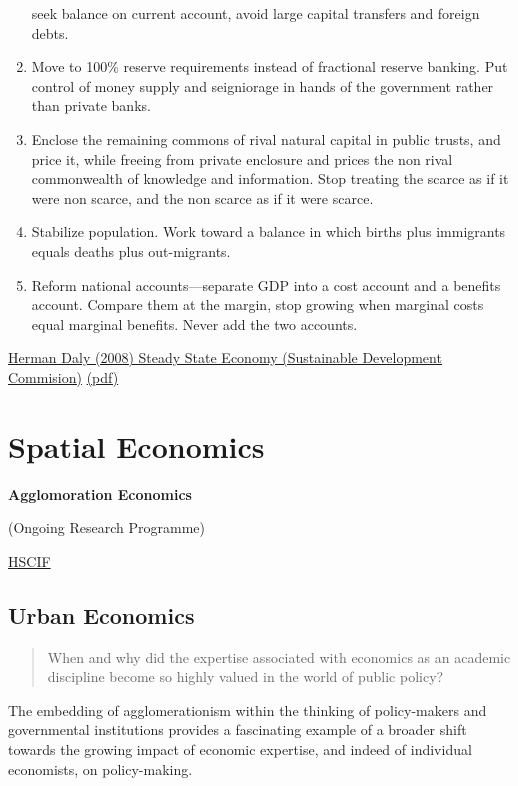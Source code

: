 \documentclass[
]{book}
\begin{document}
\begin{enumerate}
  seek balance on current account, avoid large capital transfers and foreign debts.
\item
  Move to 100\% reserve requirements instead of fractional reserve banking. Put control
  of money supply and seigniorage in hands of the government rather than private banks.
\item
  Enclose the remaining commons of rival natural capital in public trusts, and price
  it, while freeing from private enclosure and prices the non rival commonwealth of
  knowledge and information. Stop treating the scarce as if it were non scarce, and the non
  scarce as if it were scarce.
\item
  Stabilize population. Work toward a balance in which births plus immigrants equals
  deaths plus out-migrants.
\item
  Reform national accounts---separate GDP into a cost account and a benefits account.
  Compare them at the margin, stop growing when marginal costs equal marginal
  benefits. Never add the two accounts.
\end{enumerate}

\href{http://\%20www.sd-commission.org.uk/publications.php@id=775.html}{Herman Daly (2008) Steady State Economy (Sustainable Development Commision)}
\href{pdf/Daly_2008_Steady_State_Economy_SD_Commision.pdf}{(pdf)}

\hypertarget{spatial-economics}{%
\chapter{Spatial Economics}\label{spatial-economics}}

\textbf{Agglomoration Economics}

(Ongoing Research Programme)

\href{https://hscif.org/portfolio/agglomeration-economics/}{HSCIF}

\hypertarget{urban-economics}{%
\section{Urban Economics}\label{urban-economics}}

\begin{quote}
When and why did the expertise associated with economics as an academic discipline
become so highly valued in the world of public policy?
\end{quote}

The embedding of agglomerationism within the thinking of policy-makers and governmental institutions provides a fascinating example of a broader shift towards the growing impact of economic expertise, and indeed of individual economists, on policy-making.
\end{document}

